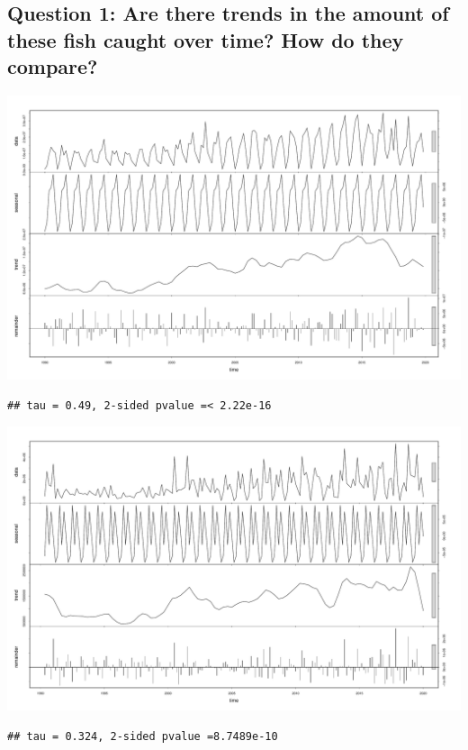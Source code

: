 \documentclass[
  12pt,
]{article}
\begin{document}
\hypertarget{question-1-are-there-trends-in-the-amount-of-these-fish-caught-over-time-how-do-they-compare}{%
\subsection{Question 1: Are there trends in the amount of these fish
caught over time? How do they
compare?}\label{question-1-are-there-trends-in-the-amount-of-these-fish-caught-over-time-how-do-they-compare}}

\includegraphics{Report_FishTrends_files/figure-latex/unnamed-chunk-1-1.pdf}

\begin{verbatim}
## tau = 0.49, 2-sided pvalue =< 2.22e-16
\end{verbatim}

\includegraphics{Report_FishTrends_files/figure-latex/unnamed-chunk-3-1.pdf}

\begin{verbatim}
## tau = 0.324, 2-sided pvalue =8.7489e-10
\end{verbatim}
\end{document}

